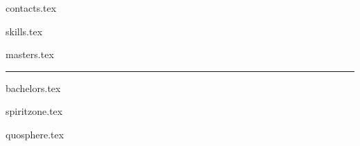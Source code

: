 \documentclass[11pt]{article}
\begin{document}
{contacts.tex}


{skills.tex}


{masters.tex}

\par\noindent\rule{\textwidth}{0.4pt}

{bachelors.tex}


{spiritzone.tex}

{quosphere.tex}
\end{document}
